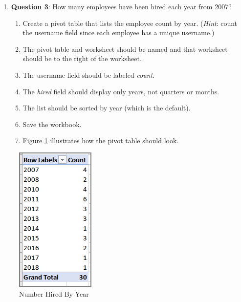 \begin{enumerate}[resume]
	\item{\textbf{Question 3}: How many employees have been hired each year from 2007?}
	
	\begin{enumerate}
		\item Create a pivot table that lists the employee count by year. (\textit{Hint}: count the username field since each employee has a unique username.)
		\item The pivot table and worksheet should be named  and that worksheet should be to the right of the  worksheet.
		\item The username field should be labeled \textit{count}. 
		\item The \textit{hired} field should display only years, not quarters or months.
		\item The list should be sorted by year (which is the default).
		\item Save the  workbook.
		\item Figure \ref{07:fig60} illustrates how the pivot table should look.
	\end{enumerate}
	
\end{enumerate}

\begin{figure}[H]
	\centering
	\includegraphics[width=\maxwidth{.75\linewidth}]{gfx/ch07_fig60}
	\caption{Number Hired By Year}
	\label{07:fig60}
\end{figure}

